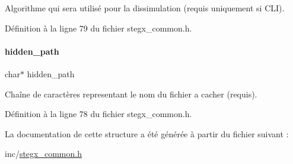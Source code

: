 Algorithme qui sera utilisé pour la dissimulation (requis uniquement si C\+LI). 

Définition à la ligne 79 du fichier stegx\+\_\+common.\+h.

\mbox{\label{a00138_a3a7e3d981f2b6994d925e38f221f79cc}} 
\paragraph{\texorpdfstring{hidden\+\_\+path}{hidden\_path}}
{\footnotesize\ttfamily char$\ast$ hidden\+\_\+path}

Chaîne de caractères representant le nom du fichier a cacher (requis). 

Définition à la ligne 78 du fichier stegx\+\_\+common.\+h.



La documentation de cette structure a été générée à partir du fichier suivant \+:\begin{DoxyCompactItemize}
\item 
inc/\hyperlink{a00008}{stegx\+\_\+common.\+h}\end{DoxyCompactItemize}
